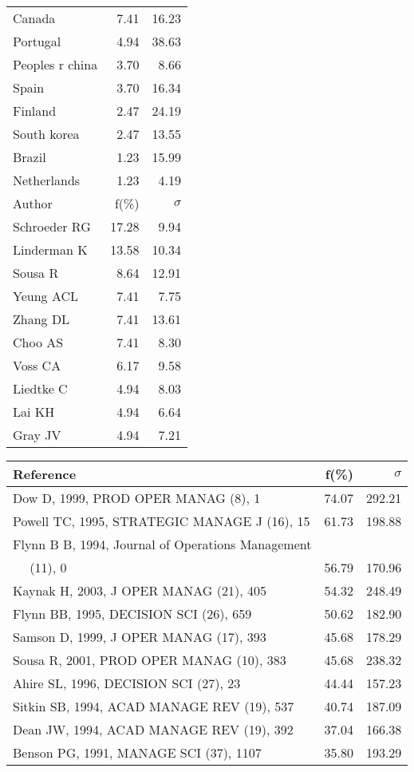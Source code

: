 \documentclass[a4paper,11pt]{report}
\begin{document}
\begin{landscape}
\begin{table}[!ht]
{\begin{tabular}{|l r r|}
Canada & 7.41 & 16.23\\
Portugal & 4.94 & 38.63\\
Peoples r china & 3.70 & 8.66\\
Spain & 3.70 & 16.34\\
Finland & 2.47 & 24.19\\
South korea & 2.47 & 13.55\\
Brazil & 1.23 & 15.99\\
Netherlands & 1.23 & 4.19\\
\hline
\hline
Author & f(\%) & $\sigma$\\
\hline
Schroeder RG & 17.28 & 9.94\\
Linderman K & 13.58 & 10.34\\
Sousa R & 8.64 & 12.91\\
Yeung ACL & 7.41 & 7.75\\
Zhang DL & 7.41 & 13.61\\
Choo AS & 7.41 & 8.30\\
Voss CA & 6.17 & 9.58\\
Liedtke C & 4.94 & 8.03\\
Lai KH & 4.94 & 6.64\\
Gray JV & 4.94 & 7.21\\
\hline
\end{tabular}
}
{\scriptsize\begin{tabular}{|l r r|}
\hline
Reference & f(\%) & $\sigma$\\
\hline
Dow D, 1999, PROD OPER MANAG (8), 1 & 74.07 & 292.21\\
Powell TC, 1995, STRATEGIC MANAGE J (16), 15 & 61.73 & 198.88\\
Flynn B B, 1994, Journal of Operations Management &  & \\
$\quad$ (11), 0 & 56.79 & 170.96\\
Kaynak H, 2003, J OPER MANAG (21), 405 & 54.32 & 248.49\\
Flynn BB, 1995, DECISION SCI (26), 659 & 50.62 & 182.90\\
Samson D, 1999, J OPER MANAG (17), 393 & 45.68 & 178.29\\
Sousa R, 2001, PROD OPER MANAG (10), 383 & 45.68 & 238.32\\
Ahire SL, 1996, DECISION SCI (27), 23 & 44.44 & 157.23\\
Sitkin SB, 1994, ACAD MANAGE REV (19), 537 & 40.74 & 187.09\\
Dean JW, 1994, ACAD MANAGE REV (19), 392 & 37.04 & 166.38\\
Benson PG, 1991, MANAGE SCI (37), 1107 & 35.80 & 193.29\\

\end{tabular}}
\end{table}
\end{landscape}
\end{document}
